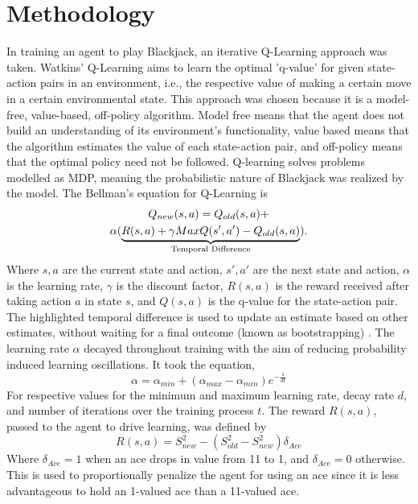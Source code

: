 \section{Methodology}

In training an agent to play Blackjack, an iterative Q-Learning approach was taken. Watkins' Q-Learning aims to learn the optimal 'q-value' for given state-action pairs in an environment, i.e., the respective value of making a certain move in a certain environmental state. This approach was chosen because it is a model-free, value-based, off-policy algorithm. Model free means that the agent does not build an understanding of its environment's functionality, value based means that the algorithm estimates the value of each state-action pair, and off-policy means that the optimal policy need not be followed. Q-learning solves problems modelled as MDP, meaning the probabilistic nature of Blackjack was realized by the model. The Bellman's equation for Q-Learning is
\begin{multline} \label{eq:Bellman}
    Q_{new}(s,a)=Q_{old}(s,a)+\\\alpha(\underbrace{R(s,a)+\gamma MaxQ(s',a')-Q_{old}(s,a)}_{\mathclap{\text{Temporal Difference}}})\text{.}
\end{multline}
Where \( s, a \) are the current state and action,  \( s', a' \) are the next state and action, \( \alpha \) is the learning rate, \( \gamma \) is the discount factor, \( R(s,a) \) is the reward received after taking action \( a \) in state \( s \), and \( Q(s,a) \) is the q-value for the state-action pair. The highlighted temporal difference is used to update an estimate based on other estimates, without waiting for a final outcome (known as bootstrapping) \cite{10.5555/3312046}. The learning rate \(\alpha\) decayed throughout training with the aim of reducing probability induced learning oscillations. It took the equation, 
\begin{equation} \label{eq:learning rate}
    \alpha = \alpha_{min} + (\alpha_{max} - \alpha_{min})e^{-\frac{1}{dt}}
\end{equation}
For respective values for the minimum and maximum learning rate, decay rate \(d\), and number of iterations over the training process \(t\). The reward \(R(s,a)\), passed to the agent to drive learning, was defined by
\begin{equation} \label{reward}
    R(s,a) = S_{new}^2 - (S_{old}^2 - S_{new}^2)\delta_{Ace}
\end{equation}
Where \(\delta_{Ace}=1\) when an ace drops in value from 11 to 1, and \(\delta_{Ace}=0\) otherwise. This is used to proportionally penalize the agent for using an ace since it is less advantageous to hold an 1-valued ace than a 11-valued ace.

